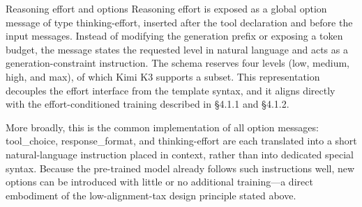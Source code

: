 \documentclass[
  10
]{article}
\begin{document}
Reasoning effort and options Reasoning effort is exposed as a global
option message of type thinking-effort, inserted after the tool
declaration and before the input messages. Instead of modifying the
generation prefix or exposing a token budget, the message states the
requested level in natural language and acts as a generation-constraint
instruction. The schema reserves four levels (low, medium, high, and
max), of which Kimi K3 supports a subset. This representation decouples
the effort interface from the template syntax, and it aligns directly
with the effort-conditioned training described in §4.1.1 and §4.1.2.

More broadly, this is the common implementation of all option messages:
tool\_choice, response\_format, and thinking-effort are each translated
into a short natural-language instruction placed in context, rather than
into dedicated special syntax. Because the pre-trained model already
follows such instructions well, new options can be introduced with
little or no additional training---a direct embodiment of the
low-alignment-tax design principle stated above.
\end{document}
